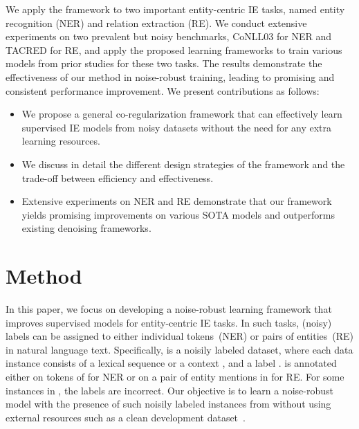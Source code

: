 \documentclass[11pt]{article}
\begin{document}
We apply the framework to two important entity-centric IE tasks, named entity recognition (NER) and relation extraction (RE).
We conduct extensive experiments on two prevalent but noisy benchmarks, CoNLL03 for NER and TACRED for RE, and apply the proposed learning frameworks to train various models from prior studies for these two tasks. 
The results demonstrate the effectiveness of our method in noise-robust training, leading to promising and consistent performance improvement.
We present contributions as follows:
\begin{itemize}[leftmargin=1em]
    \setlength\itemsep{0em}
    \item We propose a general co-regularization framework that can effectively learn supervised IE models from noisy datasets without the need for any extra learning resources.
\item We discuss in detail the different design strategies of the framework and the trade-off between efficiency and effectiveness.
    \item Extensive experiments on NER and RE demonstrate that our framework yields promising improvements on various SOTA models and outperforms existing denoising frameworks.
\end{itemize}

\section{Method}
In this paper, we focus on developing a noise-robust learning framework that improves supervised models for entity-centric IE tasks. 
In such tasks, (noisy) labels can be assigned to either individual tokens~(NER) or pairs of entities~(RE) in natural language text.
Specifically,  is a noisily labeled dataset, where each data instance consists of a lexical sequence or a context , and a label .
 is annotated either on tokens of  for NER or on a pair of entity mentions in  for RE.
For some instances in , the labels are incorrect.
Our objective is to learn a noise-robust model  with the presence of such noisily labeled instances from  without using external resources such as a clean development dataset~\cite{Qin2018RobustDS}.
\end{document}

